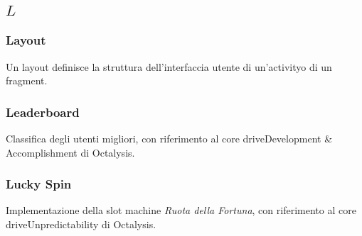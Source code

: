\subsection*{\quad$L\quad$}
\subsubsection*{Layout}
Un layout definisce la struttura dell'interfaccia utente di un'activity\glosp o di un fragment\glo.

\subsubsection*{Leaderboard}
Classifica degli utenti migliori, con riferimento al core drive\glosp Development \& Accomplishment di Octalysis\glo.

\subsubsection*{Lucky Spin}
Implementazione della slot machine \textit{Ruota della Fortuna}, con riferimento al core drive\glosp Unpredictability di Octalysis\glo.